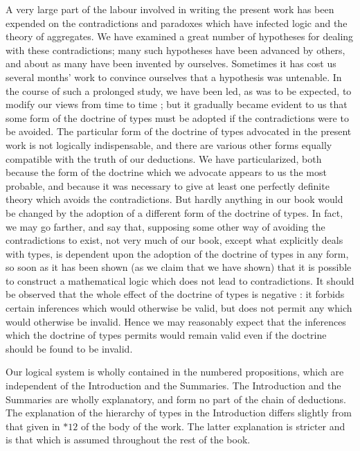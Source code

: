 \documentclass[10pt]{article}
\begin{document}
A very large part of the labour involved in writing the present work has been expended on the contradictions and paradoxes which have infected logic and the theory of aggregates. We have examined a great number of hypotheses for dealing with these contradictions; many such hypotheses have been advanced by others, and about as many have been invented by ourselves. Sometimes it has cost us several months' work to convince ourselves that a hypothesis was untenable. In the course of such a prolonged study, we have been led, as was to be expected, to modify our views from time to time ; but it gradually became evident to us that some form of the doctrine of types must be adopted if the contradictions were to be avoided. The particular form of the doctrine of types advocated in the present work is not logically indispensable, and there are various other forms equally compatible with the truth of our deductions. We have particularized, both because the form of the doctrine which we advocate appears to us the most probable, and because it was necessary to give at least one perfectly definite theory which avoids the contradictions. But hardly anything in our book would be changed by the adoption of a different form of the doctrine of types. In fact, we may go farther, and say that, supposing some other way of avoiding the contradictions to exist, not very much of our book, except what explicitly deals with types, is dependent upon the adoption of the doctrine of types in any form, so soon as it has been shown (as we claim that we have shown) that it is possible to construct a mathematical logic which does not lead to contradictions. It should be observed that the whole effect of the doctrine of types is negative : it forbids certain inferences which would otherwise be valid, but does not permit any which would otherwise be invalid. Hence we may reasonably expect that the inferences which the doctrine of types permits would remain valid even if the doctrine should be found to be invalid.

Our logical system is wholly contained in the numbered propositions, which are independent of the Introduction and the Summaries. The Introduction and the Summaries are wholly explanatory, and form no part of the chain of deductions. The explanation of the hierarchy of types in the Introduction differs slightly from that given in $* 12$ of the body of the work. The latter explanation is stricter and is that which is assumed throughout the rest of the book.
\end{document}
